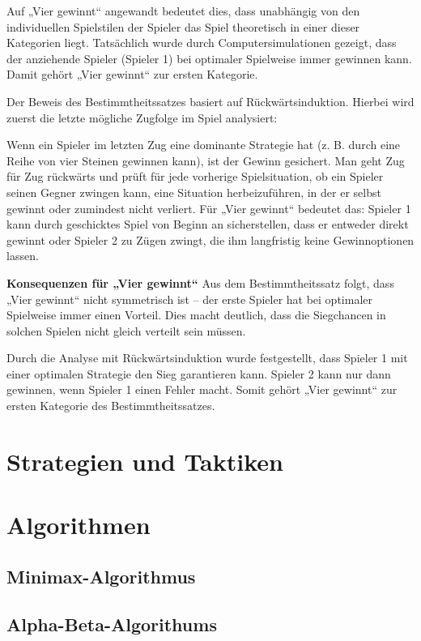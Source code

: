 	Auf „Vier gewinnt“ angewandt bedeutet dies, dass unabhängig von den individuellen Spielstilen der Spieler das Spiel theoretisch in einer dieser Kategorien liegt. Tatsächlich wurde durch Computersimulationen gezeigt, dass der anziehende Spieler (Spieler 1) bei optimaler Spielweise immer gewinnen kann. Damit gehört „Vier gewinnt“ zur ersten Kategorie.
	
	Der Beweis des Bestimmtheitssatzes basiert auf Rückwärtsinduktion. Hierbei wird zuerst die letzte mögliche Zugfolge im Spiel analysiert:
	
	Wenn ein Spieler im letzten Zug eine dominante Strategie hat (z. B. durch eine Reihe von vier Steinen gewinnen kann), ist der Gewinn gesichert.
	Man geht Zug für Zug rückwärts und prüft für jede vorherige Spielsituation, ob ein Spieler seinen Gegner zwingen kann, eine Situation herbeizuführen, in der er selbst gewinnt oder zumindest nicht verliert.
	Für „Vier gewinnt“ bedeutet das: Spieler 1 kann durch geschicktes Spiel von Beginn an sicherstellen, dass er entweder direkt gewinnt oder Spieler 2 zu Zügen zwingt, die ihm langfristig keine Gewinnoptionen lassen.
	
	\textbf{Konsequenzen für „Vier gewinnt“}
	Aus dem Bestimmtheitssatz folgt, dass „Vier gewinnt“ nicht symmetrisch ist – der erste Spieler hat bei optimaler Spielweise immer einen Vorteil. Dies macht deutlich, dass die Siegchancen in solchen Spielen nicht gleich verteilt sein müssen.
	
	Durch die Analyse mit Rückwärtsinduktion wurde festgestellt, dass Spieler 1 mit einer optimalen Strategie den Sieg garantieren kann. Spieler 2 kann nur dann gewinnen, wenn Spieler 1 einen Fehler macht. Somit gehört „Vier gewinnt“ zur ersten Kategorie des Bestimmtheitssatzes.

\section{Strategien und Taktiken}

\section{Algorithmen}
\subsection{Minimax-Algorithmus}
\subsection{Alpha-Beta-Algorithums}

